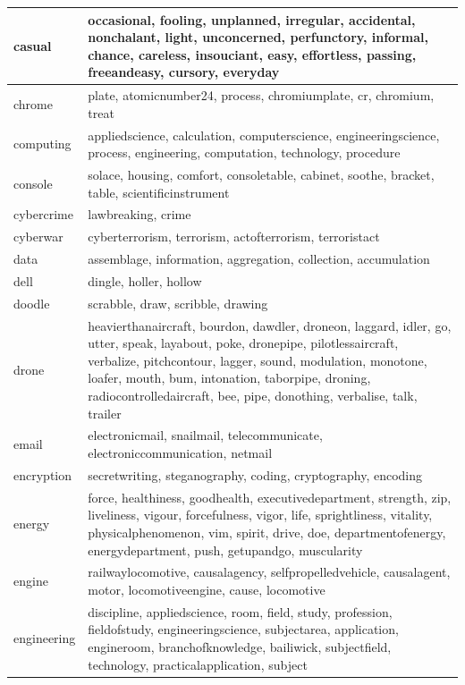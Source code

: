 \documentclass[12pt,a4paper]{report}
\begin{document}
\begin{table}[H]
\begin{center}
\begin{tabular}{|l|l|}
\hline
casual & occasional, fooling, unplanned, irregular, accidental, nonchalant, light, unconcerned, perfunctory, informal, chance, careless, insouciant, easy, effortless, passing, freeandeasy, cursory, everyday\\
\hline
chrome & plate, atomicnumber24, process, chromiumplate, cr, chromium, treat\\
\hline
computing & appliedscience, calculation, computerscience, engineeringscience, process, engineering, computation, technology, procedure\\
\hline
console & solace, housing, comfort, consoletable, cabinet, soothe, bracket, table, scientificinstrument\\
\hline
cybercrime & lawbreaking, crime\\
\hline
cyberwar & cyberterrorism, terrorism, actofterrorism, terroristact\\
\hline
data & assemblage, information, aggregation, collection, accumulation\\
\hline
dell & dingle, holler, hollow\\
\hline
doodle & scrabble, draw, scribble, drawing\\
\hline
drone & heavierthanaircraft, bourdon, dawdler, droneon, laggard, idler, go, utter, speak, layabout, poke, dronepipe, pilotlessaircraft, verbalize, pitchcontour, lagger, sound, modulation, monotone, loafer, mouth, bum, intonation, taborpipe, droning, radiocontrolledaircraft, bee, pipe, donothing, verbalise, talk, trailer\\
\hline
email & electronicmail, snailmail, telecommunicate, electroniccommunication, netmail\\
\hline
encryption & secretwriting, steganography, coding, cryptography, encoding\\
\hline
energy & force, healthiness, goodhealth, executivedepartment, strength, zip, liveliness, vigour, forcefulness, vigor, life, sprightliness, vitality, physicalphenomenon, vim, spirit, drive, doe, departmentofenergy, energydepartment, push, getupandgo, muscularity\\
\hline
engine & railwaylocomotive, causalagency, selfpropelledvehicle, causalagent, motor, locomotiveengine, cause, locomotive\\
\hline
engineering & discipline, appliedscience, room, field, study, profession, fieldofstudy, engineeringscience, subjectarea, application, engineroom, branchofknowledge, bailiwick, subjectfield, technology, practicalapplication, subject\\
\hline

\end{tabular}
\end{center}
\end{table}
\end{document}
